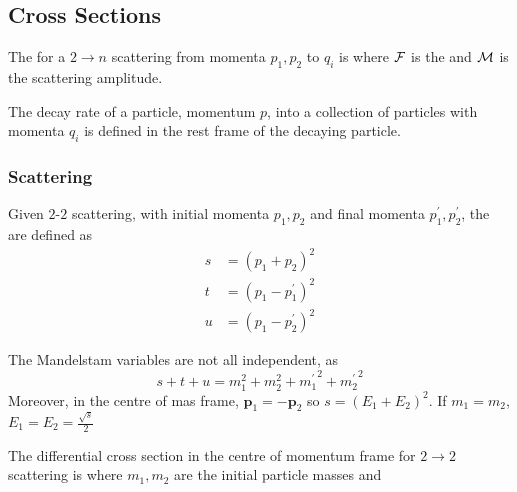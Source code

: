 \documentclass{article}
\begin{document}
\subsection{Cross Sections}

\begin{definition}
The  for a $2\to n$ scattering from momenta $p_1, p_2$ to $q_i$ is 
where $\mathcal{F}$ is the  and $\mathcal{M}$ is the scattering amplitude. 
\end{definition}

\begin{definition}
The decay rate of a particle, momentum $p$, into a collection of particles with momenta $q_i$ is 
defined in the rest frame of the decaying particle. 
\end{definition}

\subsubsection{ Scattering}

\begin{definition}
Given $2$-$2$ scattering, with initial momenta $p_1,p_2$ and final momenta $p_1^\prime, p_2^\prime$, the  are defined as 
\begin{align*}
    s &= (p_1 + p_2)^2 \\ 
    t &= (p_1 - p_1^\prime)^2 \\
    u &= (p_1 - p_2^\prime)^2 
\end{align*}
\end{definition}

\begin{theorem}
The Mandelstam variables are not all independent, as 
\[
s+t+u = m_1^2 + m_2^2 + {m_1^\prime}^2 +{m_2^\prime}^2
\]
Moreover, in the centre of mas frame, $\bm{p}_1 = -\bm{p}_2$ so $s=(E_1+E_2)^2$. If $m_1 = m_2$, $E_1=E_2 = \frac{\sqrt{s}}{2}$
\end{theorem}

\begin{prop}
The differential cross section in the centre of momentum frame for $2\to2$ scattering is 
where $m_1,m_2$ are the initial particle masses and 
\end{prop}

\end{document}
